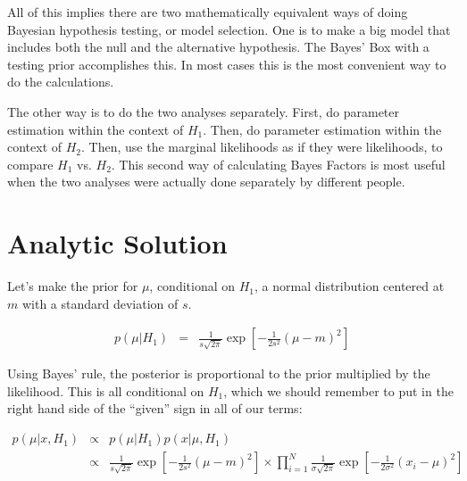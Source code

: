 All of this implies
there are two mathematically equivalent ways of doing Bayesian hypothesis testing,
or model selection. One is to make a big model that includes both the null and
the alternative hypothesis. The Bayes' Box with a testing prior accomplishes this.
In most cases this is the most convenient way to do the calculations.

The other way is to do the two analyses separately. First, do parameter estimation
within the context of $H_1$. Then, do parameter estimation within the context
of $H_2$. Then, use the marginal likelihoods as if they were likelihoods, to
compare $H_1$ vs. $H_2$. This second way of calculating Bayes Factors is
most useful when the two analyses were actually done separately by different
people.

\section{Analytic Solution}

Let's make the prior for $\mu$, conditional on $H_1$, a normal distribution
centered at $m$ with a standard deviation of $s$.

\begin{eqnarray}
p(\mu | H_1) &=& \frac{1}{s\sqrt{2\pi}}\exp
\left[-\frac{1}{2s^2}\left(\mu - m\right)^2\right]
\end{eqnarray}

Using Bayes' rule, the posterior is proportional to the prior multiplied by
the likelihood. This is all conditional on $H_1$, which we should remember
to put in the right hand side of the ``given'' sign in all of our terms:

\begin{eqnarray}
p(\mu | x, H_1) &\propto& p(\mu | H_1)p(x | \mu, H_1) \\
&\propto&
\frac{1}{s\sqrt{2\pi}}\exp
\left[-\frac{1}{2s^2}\left(\mu - m\right)^2\right]
\times
\prod_{i=1}^N \frac{1}{\sigma\sqrt{2\pi}}
\exp
\left[-\frac{1}{2\sigma^2}\left(x_i - \mu\right)^2\right]
\end{eqnarray}

